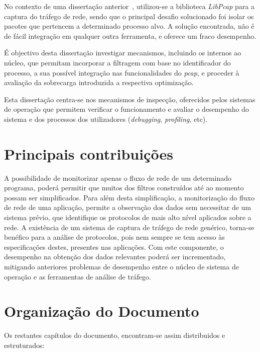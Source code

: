 No contexto de uma dissertação anterior~\cite{Farruca:2009}, utilizou-se a biblioteca \textit{LibPcap} para a captura do tráfego de rede, sendo que o principal desafio solucionado foi isolar os pacotes que pertencem a determinado processo alvo.
A solução encontrada, não é de fácil integração em qualquer outra ferramenta, e oferece um fraco desempenho.

É objectivo desta dissertação investigar mecanismos, incluindo os internos ao núcleo, que permitam incorporar a filtragem com base no identificador do processo, a sua possível integração nas funcionalidades do \textit{pcap}, e proceder à avaliação da sobrecarga introduzida a respectiva optimização.

Esta dissertação centra-se nos mecanismos de inspecção, oferecidos pelos sistemas de operação que permitem verificar o funcionamento e avaliar o desempenho do sistema e dos processos dos utilizadores (\textit{debugging}, \textit{profiling}, etc).



\section{Principais contribuições} 
\label{sec:intro_contribuicoes}

A possibilidade de monitorizar apenas o fluxo de rede de um determinado programa, poderá permitir que muitos dos filtros construídos até ao momento possam ser simplificados.
Para além desta simplificação, a monitorização do fluxo de rede de uma aplicação, permite a observação dos dados sem necessitar de um sistema prévio, que identifique os protocolos de mais alto nível aplicados sobre a rede.
A existência de um sistema de captura de tráfego de rede genérico, torna-se benéfico para a análise de protocolos, pois nem sempre se tem acesso às especificações destes, presentes nas aplicações.
Com este componente, o desempenho na obtenção dos dados relevantes poderá ser incrementado, mitigando anteriores problemas de desempenho entre o núcleo de sistema de operação e as ferramentas de análise de tráfego.

\bigskip 


\section{Organização do Documento}
\label{sec:intro_document_outline}

Os restantes capítulos do documento, encontram-se assim distribuidos e estruturados:

